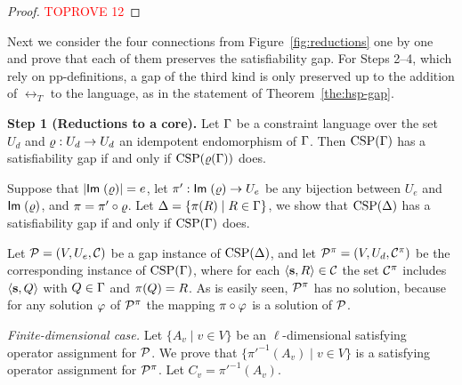\documentclass[11pt,letter]{article}
\begin{document}
\begin{proof}\textcolor{red}{TOPROVE 12}\end{proof}


Next we consider the four connections from Figure~\ref{fig:reductions} one by
one and prove that each of them preserves the satisfiability gap. For Steps
2--4, which rely on pp-definitions, a gap of the third kind is only preserved up
to the addition of $\rel_T$ to the language, as in the statement of
Theorem~\ref{the:hsp-gap}.

\smallskip

{\bf Step 1 (Reductions to a core).}
Let $\Gamma$ be a constraint language over the set $U_d$ and $\varrho:U_d\to U_d$ an idempotent
endomorphism of $\Gamma$. Then ${\rm CSP}(\Gamma)$ has a satisfiability gap if and only if ${\rm CSP}(\varrho(\Gamma))$ does.

\smallskip

Suppose that $|{\sf Im}\;(\varrho)|=e$, let $\pi':{\sf Im}\;(\varrho)\to U_e$ be any bijection between $U_e$ and ${\sf Im}\;(\varrho)$, and $\pi=\pi'\circ\varrho$. Let $\Delta=\{\pi(R)\mid R\in\Gamma\}$, we show that ${\rm CSP}(\Delta)$ has a satisfiability gap if and only if ${\rm CSP}(\Gamma)$ does.

Let ${\mathcal P}=(V,U_e,{\mathcal C})$ be a gap instance of ${\rm CSP}(\Delta)$, and let ${\mathcal P}^\pi=(V,U_d,{\mathcal C}^\pi)$ be the corresponding instance of ${\rm CSP}(\Gamma)$, where for each $\langle {\bf s},R \rangle\in{\mathcal C}$ the set ${\mathcal C}^\pi$ includes $\langle {\bf s},Q \rangle$ with $Q\in\Gamma$ and $\pi(Q)=R$. As is easily seen, ${\mathcal P}^\pi$  has no solution, because for any solution $\varphi$ of ${\mathcal P}^\pi$ the mapping $\pi\circ\varphi$ is a solution of ${\mathcal P}$. 

{\it Finite-dimensional case.}
Let $\{A_v\mid v\in V\}$ be an $\ell$-dimensional satisfying operator assignment for ${\mathcal P}$. We prove that $\{\pi'^{-1}(A_v)\mid v\in V\}$ is a satisfying operator assignment for ${\mathcal P}^\pi$. Let $C_v=\pi'^{-1}(A_v)$.
\end{document}

